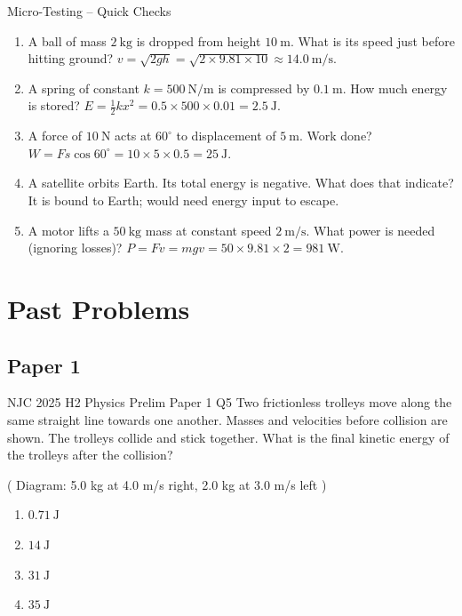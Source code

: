 \documentclass[11pt]{beamer}
\begin{document}
\begin{frame}{Micro-Testing – Quick Checks}
\begin{enumerate}
    \item A ball of mass $2\ \mathrm{kg}$ is dropped from height $10\ \mathrm{m}$. What is its speed just before hitting ground? \pause \alert{$v = \sqrt{2gh} = \sqrt{2\times9.81\times10} \approx 14.0\ \mathrm{m/s}$}.
    \item A spring of constant $k = 500\ \mathrm{N/m}$ is compressed by $0.1\ \mathrm{m}$. How much energy is stored? \pause \alert{$E = \frac12 kx^2 = 0.5\times500\times0.01 = 2.5\ \mathrm{J}$}.
    \item A force of $10\ \mathrm{N}$ acts at $60^\circ$ to displacement of $5\ \mathrm{m}$. Work done? \pause \alert{$W = Fs\cos60^\circ = 10\times5\times0.5 = 25\ \mathrm{J}$}.
    \item A satellite orbits Earth. Its total energy is negative. What does that indicate? \pause \alert{It is bound to Earth; would need energy input to escape}.
    \item A motor lifts a $50\ \mathrm{kg}$ mass at constant speed $2\ \mathrm{m/s}$. What power is needed (ignoring losses)? \pause \alert{$P = Fv = mgv = 50\times9.81\times2 = 981\ \mathrm{W}$}.
\end{enumerate}
\end{frame}

\section{Past Problems}

\subsection{Paper 1}

\begin{frame}[shrink=15]{NJC 2025 H2 Physics Prelim Paper 1 Q5}
Two frictionless trolleys move along the same straight line towards one another. Masses and velocities before collision are shown. The trolleys collide and stick together. What is the final kinetic energy of the trolleys after the collision?
\begin{center}
( Diagram: 5.0 kg at 4.0 m/s right, 2.0 kg at 3.0 m/s left )
\end{center}
\begin{enumerate}[A]
    \item $0.71\ \mathrm{J}$
    \item $14\ \mathrm{J}$
    \item $31\ \mathrm{J}$
    \item $35\ \mathrm{J}$
\end{enumerate}
\end{frame}
\end{document}
